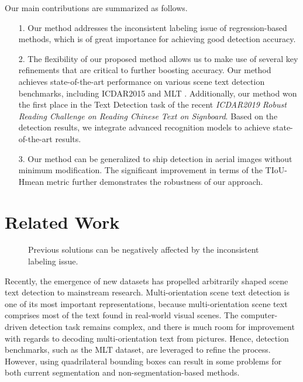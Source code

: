 Our main contributions are summarized as follows. 
\begin{itemize}
    \item[1.] Our method addresses the inconsistent labeling issue of regression-based methods, which is of great importance for achieving good detection accuracy.  
    \item[2.] The flexibility of our proposed method allows us to make use of several key refinements that are critical to further boosting accuracy. 
    Our method achieves state-of-the-art performance on various scene text detection benchmarks, including ICDAR2015 \cite{karatzas2015icdar} and MLT \cite{nayef2017icdar2017}. Additionally, our method won the first place in the Text Detection task of the recent \textit{ICDAR2019 Robust Reading Challenge on Reading Chinese Text on Signboard}. Based on the detection results, we integrate 
advanced 
    recognition models to achieve state-of-the-art results.
    \item[3.] Our method 
can be generalized to ship detection in aerial images without minimum modification. The significant improvement in terms of the TIoU-Hmean metric further demonstrates the robustness of our approach.
\end{itemize}






\section{Related Work}\label{sec:related_work}

\begin{figure*}[t!]
    \centering
    \hspace{1cm}
    \hspace{1cm}
    \caption{Previous solutions can be negatively affected by the inconsistent labeling issue.}
    \label{fig:related_work}
\end{figure*}

Recently, the emergence of new datasets \cite{ch2019total,liu2019curved,sun2019icdar,chng2019icdar2019} has propelled arbitrarily shaped scene text detection to mainstream research. Multi-orientation scene text detection is one of its most important representations, because multi-orientation scene text comprises most of the text found in real-world visual scenes. The computer-driven detection task remains complex, and there is much room for improvement with regards to decoding multi-orientation text from pictures. Hence, detection benchmarks, such as the MLT \cite{nayef2017icdar2017,nayef2019icdar2019} dataset, are leveraged to refine the process.
However, using quadrilateral bounding boxes can result in some problems for both current segmentation and non-segmentation-based methods.  


